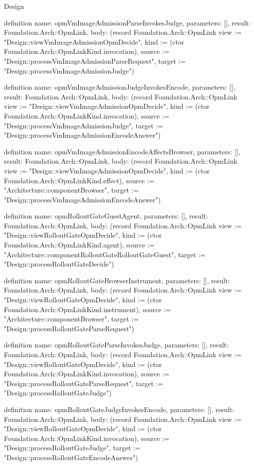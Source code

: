 \begin{lexlean}{Design}
\begin{semanticmodule}
definition{
  name: opmVmImageAdmissionParseInvokesJudge,
  parameters: [],
  result: Foundation.Arch::OpmLink,
  body: (record Foundation.Arch::OpmLink {view := "Design::viewVmImageAdmissionOpmDecide", kind := (ctor Foundation.Arch::OpmLinkKind.invocation), source := "Design::processVmImageAdmissionParseRequest", target := "Design::processVmImageAdmissionJudge"})
}

definition{
  name: opmVmImageAdmissionJudgeInvokesEncode,
  parameters: [],
  result: Foundation.Arch::OpmLink,
  body: (record Foundation.Arch::OpmLink {view := "Design::viewVmImageAdmissionOpmDecide", kind := (ctor Foundation.Arch::OpmLinkKind.invocation), source := "Design::processVmImageAdmissionJudge", target := "Design::processVmImageAdmissionEncodeAnswer"})
}

definition{
  name: opmVmImageAdmissionEncodeAffectsBrowser,
  parameters: [],
  result: Foundation.Arch::OpmLink,
  body: (record Foundation.Arch::OpmLink {view := "Design::viewVmImageAdmissionOpmDecide", kind := (ctor Foundation.Arch::OpmLinkKind.effect), source := "Architecture::componentBrowser", target := "Design::processVmImageAdmissionEncodeAnswer"})
}

definition{
  name: opmRolloutGateGuestAgent,
  parameters: [],
  result: Foundation.Arch::OpmLink,
  body: (record Foundation.Arch::OpmLink {view := "Design::viewRolloutGateOpmDecide", kind := (ctor Foundation.Arch::OpmLinkKind.agent), source := "Architecture::componentRolloutGateRolloutGateGuest", target := "Design::processRolloutGateDecide"})
}

definition{
  name: opmRolloutGateBrowserInstrument,
  parameters: [],
  result: Foundation.Arch::OpmLink,
  body: (record Foundation.Arch::OpmLink {view := "Design::viewRolloutGateOpmDecide", kind := (ctor Foundation.Arch::OpmLinkKind.instrument), source := "Architecture::componentBrowser", target := "Design::processRolloutGateParseRequest"})
}

definition{
  name: opmRolloutGateParseInvokesJudge,
  parameters: [],
  result: Foundation.Arch::OpmLink,
  body: (record Foundation.Arch::OpmLink {view := "Design::viewRolloutGateOpmDecide", kind := (ctor Foundation.Arch::OpmLinkKind.invocation), source := "Design::processRolloutGateParseRequest", target := "Design::processRolloutGateJudge"})
}

definition{
  name: opmRolloutGateJudgeInvokesEncode,
  parameters: [],
  result: Foundation.Arch::OpmLink,
  body: (record Foundation.Arch::OpmLink {view := "Design::viewRolloutGateOpmDecide", kind := (ctor Foundation.Arch::OpmLinkKind.invocation), source := "Design::processRolloutGateJudge", target := "Design::processRolloutGateEncodeAnswer"})
}


\end{semanticmodule}
\end{lexlean}
